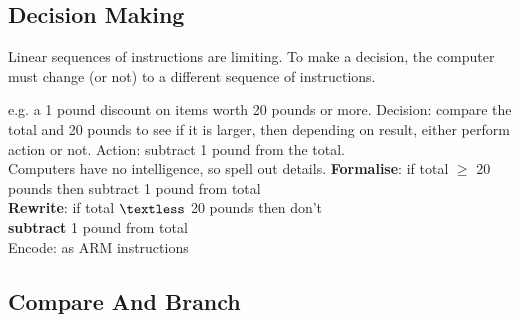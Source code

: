 \documentclass{article}
\begin{document}
\subsection{Decision Making}
Linear sequences of instructions are limiting. To make a decision, the computer must change (or not) to a
different sequence of instructions.

e.g. a 1 pound discount on items worth 20 pounds or more.
Decision: compare the total and 20 pounds to see if it is larger, then depending on result, either perform action or not.
Action: subtract 1 pound from the total.\\

Computers have no intelligence, so spell out details.
\textbf{Formalise}: if total \(\geq\) 20 pounds then subtract 1 pound from total\\
\textbf{Rewrite}: if total \(\textless\) 20 pounds then don’t\\
\textbf{subtract} 1 pound from total\\
Encode: as ARM instructions

\subsection{Compare And Branch}
\end{document}

